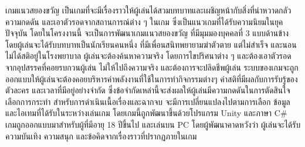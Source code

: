\maketitle
\makesignature

\ifproject
    \begin{abstractTH}

        เกมแนวสยองขวัญ เป็นเกมที่จะมีเรื่องราวให้ผู้เล่นได้สวมบทบาทและเผชิญหน้ากับสิ่งที่น่าหวาดกลัว ความกดดัน และเอาตัวรอดจากสถานการณ์ต่าง ๆ ในเกม 
        ซึ่งเป็นแนวเกมที่ได้รับความนิยมในยุคปัจจุบัน โดยในโครงงานนี้ จะเป็นการพัฒนาเกมแนวสยองขวัญ ที่มีมุมมองบุคคลที่ 3 แบบด้านข้าง โดยผู้เล่นจะได้รับบทบาทเป็นนักเรียนคนหนึ่ง 
        ที่มีเพื่อนสนิทพยายามฆ่าตัวตาย แต่ไม่สำเร็จ และนอนไม่ได้สติอยู่ในโรงพยาบาล ผู้เล่นจะต้องค้นหาความจริง โดยการไขปริศนาต่าง ๆ และต้องเอาตัวรอดจากอุปสรรคที่คอยรบกวนผู้เล่น 
        ไม่ให้ไปถึงความจริง และต้องการจะปลิดชีพผู้เล่น ระบบของเกมจะถูกออกแบบให้ผู้เล่นจะต้องคอยบริหารค่าพลังงานที่ใช้ในการทำกิจกรรมต่างๆ ค่าสติที่มีผลกับการรับรู้ของตัวละคร 
        และเวลาที่มีอยู่อย่างจำกัด ซึ่งข้อจำกัดเหล่านี้จะส่งผลให้ผู้เล่นมีความกดดันในการตัดสินใจเลือกการกระทำ สำหรับการดำเนินเนื้อเรื่องและฉากจบ จะมีการเปลี่ยนแปลงไปตามการเลือก ข้อมูล 
        และไอเทมที่ได้รับในระหว่างเล่นเกม โดยเกมนี้ถูกพัฒนาขึ้นด้วยโปรแกรม Unity และภาษา C$\#$ เกมถูกออกแบบมาสำหรับผู้ที่มีอายุ 18 ปีขึ้นไป และเล่นบน PC โดยผู้พัฒนาคาดหวังว่า 
        ผู้เล่นจะได้รับความบันเทิง ความสนุก และข้อคิดจากเรื่องราวที่ปรากฏภายในเกม
    \end{abstractTH}

